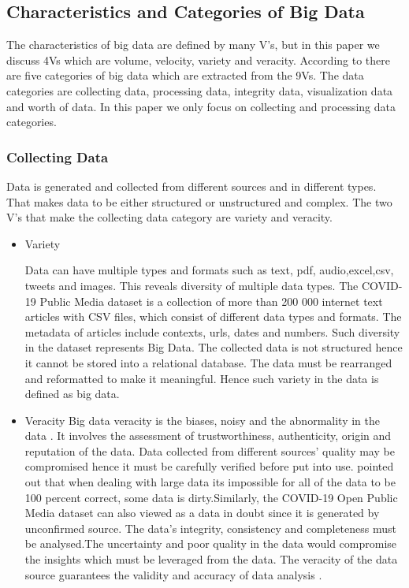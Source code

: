 \documentclass[11pt,twoside,conference]{IEEEtran}
\begin{document}
\subsection{Characteristics and Categories of Big Data}
The characteristics of big data are defined by many V's, but in this paper we discuss 4Vs which are volume, velocity, variety and veracity. According to \cite{Owais} there are five categories of big data which are extracted from the 9Vs. The data categories are collecting data, processing data, integrity data, visualization data and worth of data.  In this paper we only focus on collecting and processing data categories. 

\subsubsection{Collecting Data}
Data is generated and collected from different sources and  in different types. That makes data to be either structured or unstructured and complex. The two V's that make the collecting data category are variety and veracity. 

\begin{itemize}
    \item Variety
    
    Data can have multiple types and formats such as text, pdf, audio,excel,csv, tweets and images\cite{Johnson et al}. This reveals diversity of multiple data types. The COVID-19 Public Media dataset is a collection of  more than 200 000 internet text articles with CSV files, which consist of different data types and formats.  The metadata of articles include contexts, urls, dates and numbers. Such diversity in the dataset represents Big Data\cite{Johnson et al}. The collected data is not structured hence it cannot be stored into a relational database. The data must be rearranged  and reformatted to make it meaningful. Hence such variety in the data is defined as big data.
    
    \item Veracity
    Big data veracity is the biases, noisy and the abnormality in the data \cite{Owais}. It involves the assessment of trustworthiness, authenticity, origin and reputation of the data. Data collected from different sources' quality may be compromised hence it must be carefully verified before put into use. \cite{Ishwarappa} pointed out that when dealing with large data its impossible for all of the data to be 100 percent correct, some data is dirty.Similarly, the COVID-19 Open Public Media dataset can also viewed as a data in doubt since it is generated by unconfirmed source. The data’s integrity, consistency and completeness must be analysed.The uncertainty and poor quality in the data would compromise the insights which must be leveraged from the data. The veracity of the data source guarantees the validity and accuracy of data analysis \cite{Ishwarappa}.
\end{itemize}
\end{document}
